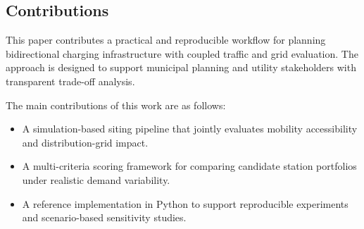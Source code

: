 \subsection{Contributions}
\label{subsec:contributions}
This paper contributes a practical and reproducible workflow for planning bidirectional charging infrastructure with coupled traffic and grid evaluation. The approach is designed to support municipal planning and utility stakeholders with transparent trade-off analysis.

The main contributions of this work are as follows:
\begin{itemize}
	\item A simulation-based siting pipeline that jointly evaluates mobility accessibility and distribution-grid impact.
	\item A multi-criteria scoring framework for comparing candidate station portfolios under realistic demand variability.
	\item A reference implementation in Python to support reproducible experiments and scenario-based sensitivity studies.
\end{itemize}
